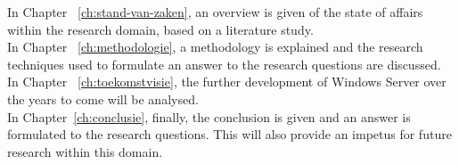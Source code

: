 In Chapter ~\ref{ch:stand-van-zaken}, an overview is given of the state of affairs within the research domain, based on a literature study.\\

In Chapter ~\ref{ch:methodologie}, a methodology is explained and the research techniques used to formulate an answer to the research questions are discussed.\\

In Chapter ~\ref{ch:toekomstvisie}, the further development of Windows Server over the years to come will be analysed. \\

In Chapter~\ref{ch:conclusie}, finally, the conclusion is given and an answer is formulated to the research questions. This will also provide an impetus for future research within this domain.\\
